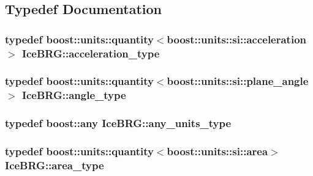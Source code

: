 \subsection{Typedef Documentation}
\hypertarget{namespaceIceBRG_ab10fe6d8fe6432a7dc0aa5a8ecac6a14}{
\subsubsection[{acceleration\-\_\-type}]{\setlength{\rightskip}{0pt plus 5cm}typedef boost\-::units\-::quantity$<$boost\-::units\-::si\-::acceleration$>$ {\bf Ice\-B\-R\-G\-::acceleration\-\_\-type}}}\label{namespaceIceBRG_ab10fe6d8fe6432a7dc0aa5a8ecac6a14}
\hypertarget{namespaceIceBRG_a688eeb0811a2474b20b667ed2e9625a1}{
\subsubsection[{angle\-\_\-type}]{\setlength{\rightskip}{0pt plus 5cm}typedef boost\-::units\-::quantity$<$boost\-::units\-::si\-::plane\-\_\-angle$>$ {\bf Ice\-B\-R\-G\-::angle\-\_\-type}}}\label{namespaceIceBRG_a688eeb0811a2474b20b667ed2e9625a1}
\hypertarget{namespaceIceBRG_a3101fc159e191fa99c4ec14e445df96e}{
\subsubsection[{any\-\_\-units\-\_\-type}]{\setlength{\rightskip}{0pt plus 5cm}typedef boost\-::any {\bf Ice\-B\-R\-G\-::any\-\_\-units\-\_\-type}}}\label{namespaceIceBRG_a3101fc159e191fa99c4ec14e445df96e}
\hypertarget{namespaceIceBRG_afed43f9e24ef5cdea34327ea9e9b1b83}{
\subsubsection[{area\-\_\-type}]{\setlength{\rightskip}{0pt plus 5cm}typedef boost\-::units\-::quantity$<$boost\-::units\-::si\-::area$>$ {\bf Ice\-B\-R\-G\-::area\-\_\-type}}}\label{namespaceIceBRG_afed43f9e24ef5cdea34327ea9e9b1b83}
